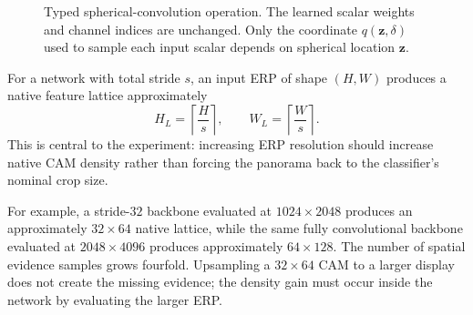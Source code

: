 \documentclass[a4paper,9pt]{extarticle}
\newcommand{\R}{\mathbb R}
\begin{document}
\begin{figure}[t]
\centering
{}
\caption{Typed spherical-convolution operation. The learned scalar weights and channel indices are unchanged. Only the coordinate $q(\mathbf z,\delta)$ used to sample each input scalar depends on spherical location $\mathbf z$.}
\label{fig:sconvtypes}
\end{figure}

For a network with total stride $s$, an input ERP of shape $(H,W)$ produces a native feature lattice approximately
\begin{equation}
 H_L=\left\lceil\frac{H}{s}\right\rceil,\qquad
 W_L=\left\lceil\frac{W}{s}\right\rceil.
 \label{eq:density}
\end{equation}
This is central to the experiment: increasing ERP resolution should increase native CAM density rather than forcing the panorama back to the classifier's nominal crop size.

For example, a stride-$32$ backbone evaluated at $1024\times2048$ produces an
approximately $32\times64$ native lattice, while the same fully convolutional
backbone evaluated at $2048\times4096$ produces approximately $64\times128$.
The number of spatial evidence samples grows fourfold. Upsampling a
$32\times64$ CAM to a larger display does not create the missing evidence; the
density gain must occur inside the network by evaluating the larger ERP.
\end{document}
